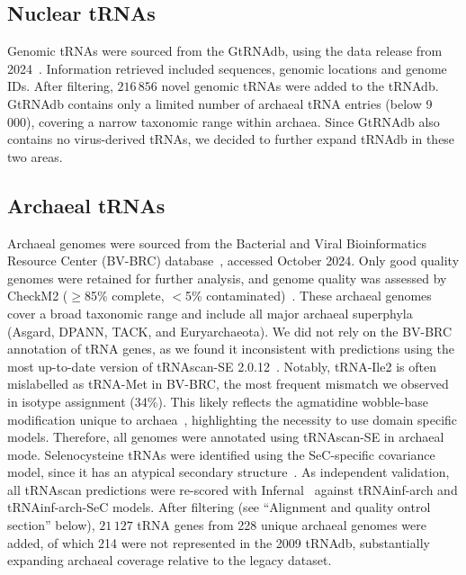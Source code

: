 \documentclass[unnumsec,webpdf,contemporary,large]{oup-authoring-template}
\begin{document}
\subsection{Nuclear tRNAs}\label{subsecgenomictRNA}
Genomic tRNAs were sourced from the GtRNAdb, using the data release from
2024~\cite{gtrnadb}. Information retrieved included sequences, genomic
locations and genome IDs.  After filtering, $216\,856$ novel genomic tRNAs
were added to the tRNAdb.  GtRNAdb contains only a limited number of
archaeal tRNA entries (below 9\,000), covering a narrow taxonomic range
within archaea.  Since GtRNAdb also contains no virus-derived tRNAs, we
decided to further expand tRNAdb in these two areas.

\subsection{Archaeal tRNAs}

Archaeal genomes were sourced from the Bacterial and Viral Bioinformatics Resource Center (BV-BRC) database~\cite{bvbrc2022}, accessed October 2024. Only good quality genomes were retained for further analysis, and genome quality was assessed by CheckM2 ($\geq$85\% complete,
$<$5\% contaminated)~\cite{checkm2}. These archaeal genomes cover a broad
taxonomic range and include all major archaeal superphyla (Asgard, DPANN,
TACK, and Euryarchaeota).  We did not rely on the BV-BRC annotation of tRNA
genes, as we found it inconsistent with predictions using the most
up-to-date version of tRNAscan-SE 2.0.12~\cite{tRNAscan}. Notably,
tRNA-Ile2 is often mislabelled as tRNA-Met in BV-BRC, the most frequent
mismatch we observed in isotype assignment (34\%). This likely reflects the
agmatidine wobble-base modification unique to archaea~\cite{tRNAscan},
highlighting the necessity to use domain specific models.  Therefore, all
genomes were annotated using tRNAscan-SE in archaeal mode. Selenocysteine
tRNAs were identified using the SeC-specific covariance model, since it has
an atypical secondary structure~\cite{tRNAscan}. As independent validation,
all tRNAscan predictions were re-scored with Infernal~\cite{infernal}
against tRNAinf-arch and tRNAinf-arch-SeC models. After filtering (see ``Alignment and quality ontrol section'' below),
$21\,127$ tRNA genes from 228 unique archaeal genomes were added, of which
214 were not represented in the 2009 tRNAdb, substantially expanding
archaeal coverage relative to the legacy dataset.
\end{document}
